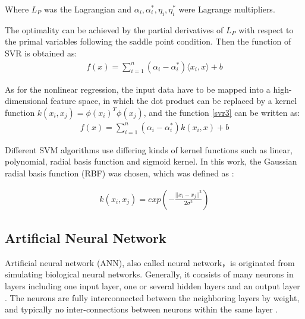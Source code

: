 \documentclass[11pt]{article}
\begin{document}
	Where $L_P$ was the Lagrangian and $ \alpha_i, \alpha_i^*, \eta_i, \eta_i^* $ were Lagrange multipliers.
	
	The optimality can be achieved by the partial derivatives of $L_P$ with respect to the primal variables following the saddle point condition. Then the function of SVR is obtained as:
	\begin{eqnarray}\label{svr3}
	f(x) = \sum_{i=1}^{n} (\alpha_i - \alpha_i^*)\langle x_i , x \rangle +b                                                             
	\end{eqnarray}
	
	As for the nonlinear regression, the input data have to be mapped into a high-dimensional feature space, in which the dot product can be replaced by a kernel function $k(x_i, x_j) = \phi(x_i)^T\phi(x_j)$, and the function \eqref{svr3} can be written as:
	\begin{eqnarray}
	f(x) = \sum_{i=1}^{n}(\alpha_i - \alpha_i^*)k(x_i , x) +b                                                          
	\end{eqnarray}
	
	Different SVM algorithms use differing kinds of kernel functions such as linear, polynomial, radial basis function and sigmoid kernel. In this work, the Gaussian radial basis function (RBF) was chosen, which was defined as \cite{smola2004tutorial}:

	\begin{eqnarray}
	k(x_i, x_j) = exp ({- \frac{||x_i -x_j ||^2}{2 \sigma^2} })                                                           
	\end{eqnarray}
	
	
	\subsection{Artificial Neural Network}
	Artificial neural network (ANN), also called neural network，is originated from simulating biological neural networks. Generally, it consists of many neurons in layers including one input layer, one or several hidden layers and an output layer \cite{mukherjee1997artificial}. The neurons are fully interconnected between the neighboring layers by weight, and typically no inter-connections between neurons within the same layer \cite{naderpour2018compressive}. 
	
\end{document}
